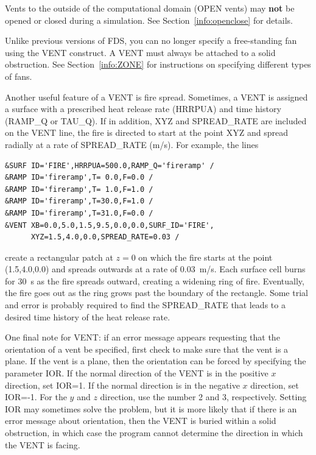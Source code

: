 \documentclass[11pt]{book}
\begin{document}
Vents to the outside of the computational domain ({\ct OPEN} vents)
may {\bf not} be opened or closed during a simulation. See Section~\ref{info:openclose} for details.

Unlike previous versions of FDS, you can no longer specify a free-standing fan using the {\ct VENT}
construct. A {\ct VENT} must always be attached to a solid obstruction. See
Section~\ref{info:ZONE} for instructions on specifying different types of fans.

Another useful feature of a {\ct VENT} is fire spread. Sometimes, a {\ct VENT}
is assigned a surface with a prescribed heat release rate ({\ct HRRPUA}) and
time history ({\ct RAMP\_Q} or {\ct TAU\_Q}). If in addition, {\ct XYZ} and {\ct SPREAD\_RATE} are
included on the {\ct VENT} line, the fire is directed to start at the point {\ct XYZ} and spread
radially at a rate of {\ct SPREAD\_RATE} (m/s).
For example, the lines

\footnotesize
\begin{verbatim}
&SURF ID='FIRE',HRRPUA=500.0,RAMP_Q='fireramp' /
&RAMP ID='fireramp',T= 0.0,F=0.0 /
&RAMP ID='fireramp',T= 1.0,F=1.0 /
&RAMP ID='fireramp',T=30.0,F=1.0 /
&RAMP ID='fireramp',T=31.0,F=0.0 /
&VENT XB=0.0,5.0,1.5,9.5,0.0,0.0,SURF_ID='FIRE',
      XYZ=1.5,4.0,0.0,SPREAD_RATE=0.03 /
\end{verbatim}
\normalsize
create a rectangular patch at $z=0$ on which the fire starts at the
point (1.5,4.0,0.0) and spreads outwards at a rate of 0.03~m/s. Each surface cell
burns for 30~s as the fire spreads outward, creating a widening ring of fire.
Eventually, the fire goes out as the ring grows past the boundary of the rectangle.
Some trial and error is probably required to find the {\ct SPREAD\_RATE} that
leads to a desired time history of the heat release rate.

One final note for {\ct VENT}: if an error message appears requesting that
the orientation of a vent be specified, first check to make sure that the vent is a plane.
If the vent is a plane, then the orientation can be forced by specifying the parameter {\ct IOR}.
If the normal direction of the {\ct VENT} is in the positive $x$ direction, set {\ct IOR=1}.
If the normal direction is in the negative $x$ direction, set {\ct IOR=-1}. For the $y$ and
$z$ direction, use the number 2 and 3, respectively. Setting {\ct IOR} may sometimes solve
the problem, but it is more likely that if there is an error message about orientation, then
the {\ct VENT} is buried within a solid obstruction, in which case the program cannot determine
the direction in which the {\ct VENT} is facing.
\end{document}
